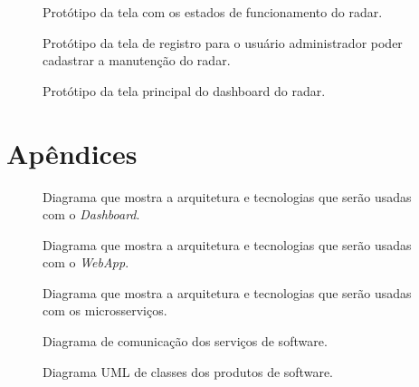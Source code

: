 \begin{figure}[ht]
	\caption{\label{fig:tela_status} Protótipo da tela com os estados de funcionamento do radar.}
\end{figure}\newpage

\begin{figure}[ht]
	\caption{\label{fig:tela_registro} Protótipo da tela de registro para o usuário administrador poder cadastrar a manutenção do radar.}
\end{figure}\newpage

\begin{figure}[ht]
	\caption{\label{fig:tela_dashboard} Protótipo da tela principal do dashboard do radar.}
\end{figure}\newpage

\chapter{Apêndices}
\begin{figure}[h!]
	\caption{\label{fig:diagrama-arq-dashboard} Diagrama que mostra a arquitetura e tecnologias que serão usadas com o \textit{Dashboard}.}
\end{figure}

\begin{figure}[h!]
	\caption{\label{fig:diagrama-arq-webApp} Diagrama que mostra a arquitetura e tecnologias que serão usadas com o \textit{WebApp}.}
\end{figure}

\begin{figure}[!h]
	\caption{\label{fig:diagrama-arq-microsservicos} Diagrama que mostra a arquitetura e tecnologias que serão usadas com os microsserviços.}
\end{figure}

\begin{figure}[ht]
	\caption{\label{fig:diagrama-comm-soft} Diagrama de comunicação dos serviços de software.}
\end{figure}

\begin{figure}[ht]
	\caption{\label{fig:diagrama-classe-soft} Diagrama UML de classes dos produtos de software.}
\end{figure}
